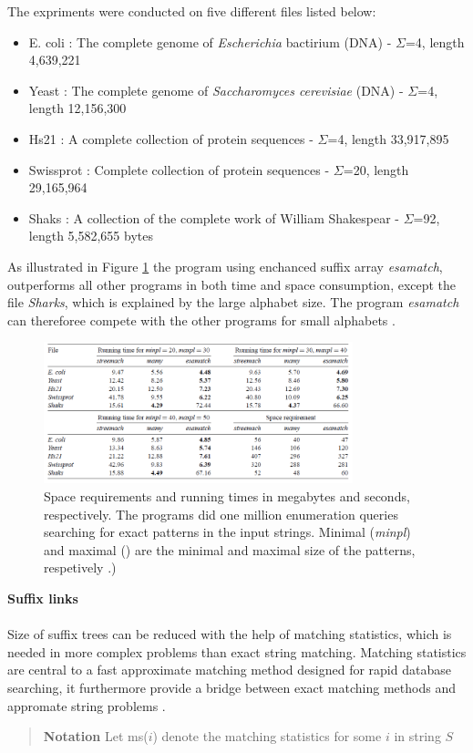 \documentclass[12pt]{article} %
\begin{document}
The expriments were conducted on five different files listed below:
\begin{itemize} label{FILES}  
\item E. coli : The complete genome of \emph{Escherichia} bactirium (DNA) - $\Sigma$=4, length 4,639,221 
\item Yeast : The complete genome of \emph{Saccharomyces cerevisiae} (DNA) - $\Sigma$=4, length 12,156,300 
\item Hs21 : A complete collection of protein sequences - $\Sigma$=4, length 33,917,895
\item Swissprot : Complete collection of protein sequences - $\Sigma$=20, length 29,165,964
\item Shaks : A collection of the complete work of William Shakespear - $\Sigma$=92, length 5,582,655 bytes
\end{itemize}

As illustrated in Figure \ref{fig:TopDown} the program using enchanced suffix array \emph{esamatch}, outperforms all other programs in both time and space consumption, except the file \emph{Sharks}, which is explained by the large alphabet size. The program \emph{esamatch} can thereforee compete with the other programs for small alphabets \cite{enchancedsuffix}.

\begin{figure}[H]
    \centering
    \includegraphics[width=0.8\textwidth]{TopDown}
    \captionsetup{width=0.8
    \textwidth}
    \caption{Space requirements and running times in megabytes and seconds, respectively. The programs did one million enumeration queries searching for exact patterns in the input strings. Minimal (\emph{minpl}) and maximal () are the minimal and maximal size of the patterns, respetively \cite{enchancedsuffix}.)}
    \label{fig:TopDown}
    
\end{figure}
\textbf{Suffix links}
\\ \\
Size of suffix trees can be reduced with the help of matching statistics, which is needed in more complex problems than exact string matching. Matching statistics are central to a fast approximate matching method designed for rapid database searching, it furthermore provide a bridge between exact matching methods and appromate string problems \cite{gusfield}.
\begin{quote}
\textbf{Notation} 
Let ms($i$) denote the matching statistics for some $i$ in string $S$
\end{quote}
\end{document}
